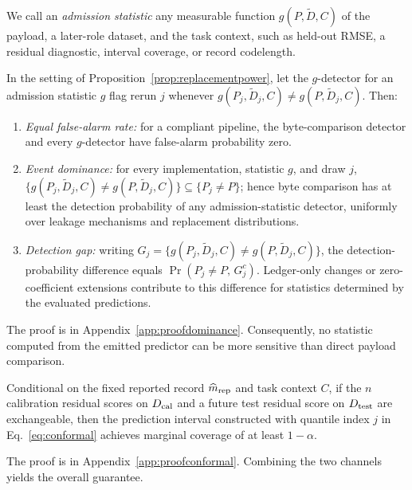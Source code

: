 We call an \emph{admission statistic} any measurable function \(g(P,\widetilde D,C)\) of the payload, a later-role dataset, and the task context, such as held-out RMSE, a residual diagnostic, interval coverage, or record codelength.

\begin{proposition}\label{prop:dominance}
In the setting of Proposition~\ref{prop:replacementpower}, let the \(g\)-detector for an admission statistic \(g\) flag rerun \(j\) whenever \(g(P_j,\widetilde D_j,C)\neq g(P,\widetilde D_j,C)\). Then:
\begin{enumerate}
\item[(i)] \emph{Equal false-alarm rate:} for a compliant pipeline, the byte-comparison detector and every \(g\)-detector have false-alarm probability zero.
\item[(ii)] \emph{Event dominance:} for every implementation, statistic \(g\), and draw \(j\), \(\{g(P_j,\widetilde D_j,C)\neq g(P,\widetilde D_j,C)\}\subseteq\{P_j\neq P\}\); hence byte comparison has at least the detection probability of any admission-statistic detector, uniformly over leakage mechanisms and replacement distributions.
\item[(iii)] \emph{Detection gap:} writing \(G_j=\{g(P_j,\widetilde D_j,C)\neq g(P,\widetilde D_j,C)\}\), the detection-probability difference equals \(\Pr(P_j\neq P,\,G_j^c)\). Ledger-only changes or zero-coefficient extensions contribute to this difference for statistics determined by the evaluated predictions.
\end{enumerate}
\end{proposition}

The proof is in Appendix~\ref{app:proofdominance}. Consequently, no statistic computed from the emitted predictor can be more sensitive than direct payload comparison.

\begingroup\sloppy
\begin{proposition}\label{prop:conformal}
Conditional on the fixed reported record \(\widehat m_{\rm rep}\) and task context \(C\), if the \(n\) calibration residual scores on \(D_{\rm cal}\) and a future test residual score on \(D_{\rm test}\) are exchangeable, then the prediction interval constructed with quantile index \(j\) in Eq.~\eqref{eq:conformal} achieves marginal coverage of at least \(1-\alpha\).
\end{proposition}
\endgroup

The proof is in Appendix~\ref{app:proofconformal}. Combining the two channels yields the overall guarantee.

